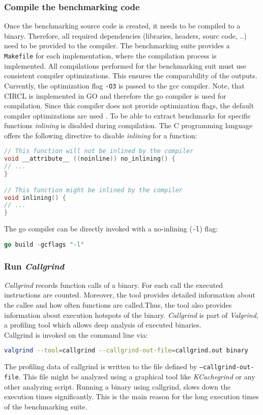 \subsubsection{Compile the benchmarking code}
Once the benchmarking source code is created, it needs to be compiled to a binary. Therefore, all required dependencies (libraries, headers, sourc code, ..) need to be provided to the compiler. The benchmarking suite provides a \texttt{Makefile} for each implementation, where the compilation process is implemented.
All compilations performed for the benchmarking suit must use consistent compiler optimizations. This ensures the comparability of the outputs. Currently, the optimization flag \texttt{-O3} is passed to the gcc compiler. Note, that CIRCL is implemented in GO and therefore the go compiler is used for compilation. Since this compiler does not provide optimization flags, the default compiler optimizations are used \parencite{gowiki2020compiler}.
To be able to extract benchmarks for specific functions \textit{inlining} is disabled during compilation. The C programming language offers the following directive to disable \textit{inlining} for a function:
\begin{lstlisting}[language=C]
// This function will not be inlined by the compiler
void __attribute__ ((noinline)) no_inlining() {
// ...
}

// This function might be inlined by the compiler
void inlining() {
// ...
}
\end{lstlisting}
The go compiler can be directly invoked with a no-inlining (\texttt{-l}) flag:
\begin{lstlisting}[language=Go]
go build -gcflags "-l"
\end{lstlisting}

\subsubsection{Run \textit{Callgrind}}
\textit{Callgrind} records function calls of a binary. For each call the executed instructions are counted. Moreover, the tool provides detailed information about the callee and how often functions are called.Thus, the tool also provides information about execution hotspots of the binary. \textit{Callgrind} is part of \textit{Valgrind}, a profiling tool which allows deep analysis of executed binaries.\\
Callgrind is invoked on the command line via:
\begin{lstlisting}[language=Bash]
valgrind --tool=callgrind --callgrind-out-file=callgrind.out binary
\end{lstlisting}
The profiling data of callgrind is written to the file defined by \texttt{--callgrind-out-file}. This file might be analyzed using a graphical tool like \textit{KCachegrind} or any other analyzing script.
Running a binary using callgrind, slows down the execution times significantly. This is the main reason for the long execution times of the benchmarking suite. 

